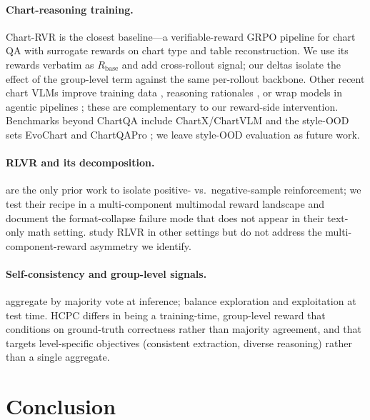 \documentclass[11pt]{article}
\begin{document}
\paragraph{Chart-reasoning training.} Chart-RVR \citep{chartrvr2025}
is the closest baseline---a verifiable-reward GRPO pipeline for chart
QA with surrogate rewards on chart type and table reconstruction. We
use its rewards verbatim as $R_{\text{base}}$ and add cross-rollout
signal; our deltas isolate the effect of the group-level term against
the same per-rollout backbone. Other recent chart VLMs improve
training data \citep{chartgemma,chartinstruct,bigcharts2025},
reasoning rationales \citep{chartr12025,chartqax2026,distill-vcr-2025},
or wrap models in agentic pipelines
\citep{chartagent2025,vprochart2025,chartcitor2025,chartpoint2025};
these are complementary to our reward-side intervention. Benchmarks
beyond ChartQA include ChartX/ChartVLM \citep{chartx2024} and the
style-OOD sets EvoChart \citep{evochart} and ChartQAPro
\citep{chartqapro}; we leave style-OOD evaluation as future work.

\paragraph{RLVR and its decomposition.} \citet{zhu2025nsr} are the
only prior work to isolate positive- vs.\ negative-sample
reinforcement; we test their recipe in a multi-component multimodal
reward landscape and document the format-collapse failure mode that
does not appear in their text-only math setting.
\citet{su2025crossing,wen2025rlvr,rlvmr2025,koksal2025fewshot}
study RLVR in other settings but do not address the
multi-component-reward asymmetry we identify.

\paragraph{Self-consistency and group-level signals.} \citet{wang2022sc}
aggregate by majority vote at inference; \citet{ettrl2025} balance
exploration and exploitation at test time. HCPC differs in being a
training-time, group-level reward that conditions on ground-truth
correctness rather than majority agreement, and that targets
level-specific objectives (consistent extraction, diverse reasoning)
rather than a single aggregate.

\section{Conclusion}
\end{document}
